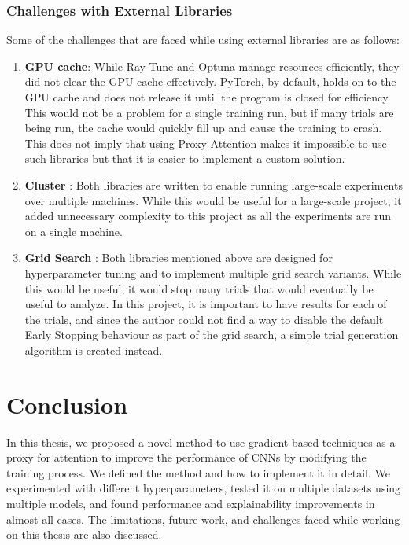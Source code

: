 \documentclass[a4paper,11pt,openright]{book}
\begin{document}
\subsection{Challenges with External Libraries} \label{sec:challenges_with_external_libraries}
Some of the challenges that are faced while using external libraries are as follows:
\begin{enumerate}
    \item \textbf{GPU cache}: While \href{https://docs.ray.io/en/latest/tune/index.html}{Ray Tune} and \href{https://optuna.org/}{Optuna} manage resources efficiently, they did not clear the GPU cache effectively. PyTorch, by default, holds on to the GPU cache and does not release it until the program is closed for efficiency. This would not be a problem for a single training run, but if many trials are being run, the cache would quickly fill up and cause the training to crash. This does not imply that using Proxy Attention makes it impossible to use such libraries but that it is easier to implement a custom solution.
    \item \textbf{Cluster} : Both libraries are written to enable running large-scale experiments over multiple machines. While this would be useful for a large-scale project, it added unnecessary complexity to this project as all the experiments are run on a single machine.
    \item \textbf{Grid Search} : Both libraries mentioned above are designed for hyperparameter tuning and to implement multiple grid search variants. While this would be useful, it would stop many trials that would eventually be useful to analyze. In this project, it is important to have results for each of the trials, and since the author could not find a way to disable the default Early Stopping behaviour as part of the grid search, a simple trial generation algorithm is created instead.
\end{enumerate}

\chapter{Conclusion} \label{ch:conclusion}
In this thesis, we proposed a novel method to use gradient-based techniques as a proxy for attention to improve the performance of CNNs by modifying the training process. We defined the method and how to implement it in detail. We experimented with different hyperparameters, tested it on multiple datasets using multiple models, and found performance and explainability improvements in almost all cases. The limitations, future work, and challenges faced while working on this thesis are also discussed.
\end{document}
